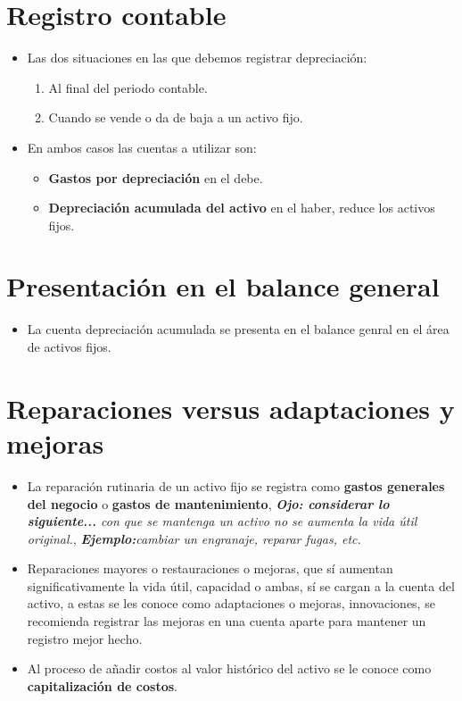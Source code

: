 \documentclass{article}
\begin{document}
\section{Registro contable}
\begin{itemize}
    \item Las dos situaciones en las que debemos registrar depreciación:
        \begin{enumerate}
            \item Al final del periodo contable.
            \item Cuando se vende o da de baja a un activo fijo.
        \end{enumerate}
    
    \item En ambos casos las cuentas a utilizar son:
        \begin{itemize}
            \item \textbf{Gastos por depreciación} en el debe.
            \item \textbf{Depreciación acumulada del activo} en el haber, reduce los activos fijos.
        \end{itemize}
\end{itemize}

\section{Presentación en el balance general}
\begin{itemize}
    \item La cuenta depreciación acumulada se presenta en el balance genral en el área de activos fijos.
\end{itemize}

\section{Reparaciones versus adaptaciones y mejoras}
\begin{itemize}
    \item La reparación rutinaria de un activo fijo se registra como \textbf{gastos generales del negocio} o \textbf{gastos de mantenimiento}, \emph{\textbf{Ojo: considerar lo siguiente...} con que se mantenga un activo no se aumenta la vida útil original.}, \emph{\textbf{Ejemplo:}cambiar un engranaje, reparar fugas, etc.}
    \item Reparaciones mayores o restauraciones o mejoras, que sí aumentan significativamente la vida útil, capacidad o ambas, sí se cargan a la cuenta del activo, a estas se les conoce como adaptaciones o mejoras, innovaciones, se recomienda registrar las mejoras en una cuenta aparte para mantener un registro mejor hecho.
    \item Al proceso de añadir costos al valor histórico del activo se le conoce como \textbf{capitalización de costos}.
\end{itemize}
\end{document}

